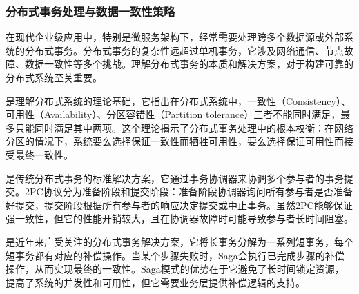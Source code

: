 \hypertarget{ux5206ux5e03ux5f0fux4e8bux52a1ux5904ux7406ux4e0eux6570ux636eux4e00ux81f4ux6027ux7b56ux7565}{%
\subsubsection{分布式事务处理与数据一致性策略}\label{ux5206ux5e03ux5f0fux4e8bux52a1ux5904ux7406ux4e0eux6570ux636eux4e00ux81f4ux6027ux7b56ux7565}}

在现代企业级应用中，特别是微服务架构下，经常需要处理跨多个数据源或外部系统的分布式事务。分布式事务的复杂性远超过单机事务，它涉及网络通信、节点故障、数据一致性等多个挑战。理解分布式事务的本质和解决方案，对于构建可靠的分布式系统至关重要。

是理解分布式系统的理论基础，它指出在分布式系统中，一致性（Consistency）、可用性（Availability）、分区容错性（Partition tolerance）三者不能同时满足，最多只能同时满足其中两项。这个理论揭示了分布式事务处理中的根本权衡：在网络分区的情况下，系统要么选择保证一致性而牺牲可用性，要么选择保证可用性而接受最终一致性。

是传统分布式事务的标准解决方案，它通过事务协调器来协调多个参与者的事务提交。2PC协议分为准备阶段和提交阶段：准备阶段协调器询问所有参与者是否准备好提交，提交阶段根据所有参与者的响应决定提交或中止事务。虽然2PC能够保证强一致性，但它的性能开销较大，且在协调器故障时可能导致参与者长时间阻塞。

是近年来广受关注的分布式事务解决方案，它将长事务分解为一系列短事务，每个短事务都有对应的补偿操作。当某个步骤失败时，Saga会执行已完成步骤的补偿操作，从而实现最终的一致性。Saga模式的优势在于它避免了长时间锁定资源，提高了系统的并发性和可用性，但它需要业务层提供补偿逻辑的支持。

